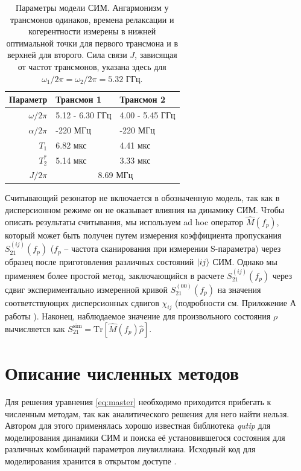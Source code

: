 \documentclass[14pt, a4paper]{extreport}
\DeclarePairedDelimiter\ket{\lvert}{\rangle}
\newcommand{\Tr}{\text{Tr}}
\numberwithin{equation}{section}
\begin{document}
\begin{table}\small\centering
		\begin{tabular}{rll}\toprule
			Параметр & Трансмон 1  & Трансмон 2\\\midrule
			$\omega/2\pi$ & 5.12 - 6.30  ГГц & 4.00 - 5.45 ГГц\\
			$\alpha/2\pi$ & -220 МГц & -220 МГц \\
			$T_1$  & 6.82 мкс &  4.41 мкс \\
			$T_2^*$  & 5.14 мкс  &  3.33 мкс\\
			$J/2\pi$  &\multicolumn{2}{c}{8.69 МГц}\\ \bottomrule
		\end{tabular}
	\caption{Параметры модели СИМ. Ангармонизм у трансмонов одинаков, времена релаксации и когерентности измерены в нижней оптимальной точки для первого трансмона и в верхней для второго. Сила связи $J$, зависящая от частот трансмонов, указана здесь для $\omega_1/2\pi = \omega_2/2\pi = 5.32$ ГГц.}
	\label{tab:parameters}
\end{table}	


Считывающий резонатор не включается в обозначенную модель, так как в дисперсионном режиме он не оказывает влияния на динамику СИМ. Чтобы описать результаты считывания, мы используем ad hoc оператор $\hat M(f_p)$, который может быть получен путем измерения коэффициента пропускания $S_{21}^{(ij)}(f_p)$ ($f_p$ -- частота сканирования при измерении S-параметра) через образец после приготовления различных состояний $\ket{ij}$ СИМ. Однако мы применяем более простой метод, заключающийся в расчете $S_{21}^{(ij)}(f_p)$ через сдвиг экспериментально измеренной кривой $S_{21}^{(00)}(f_p)$ на значения соответствующих дисперсионных сдвигов $\chi_{ij}$ \cite{chow2010detecting, filipp2011multimode} (подробности см. Приложение А работы \cite{fedorov2020light}). Наконец, наблюдаемое значение для произвольного состояния $\rho$ вычисляется как $S_{21}^\text{sim} = \Tr[\hat M(f_p)\hat \rho]$.

\section{Описание численных методов}

Для решения уравнения \eqref{eq:master} необходимо приходится прибегать к численным методам, так как аналитического решения для него найти нельзя. Автором для этого применялась хорошо известная библиотека \textit{qutip} \cite{johansson2013qutip} для моделирования динамики СИМ и поиска её установившегося состояния для различных комбинаций параметров лиувиллиана. Исходный код для моделирования хранится в открытом доступе \cite{fedorov2020samcode}. 
\end{document}
